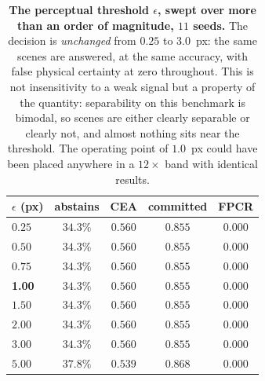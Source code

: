 \begin{table}[!ht]
\caption{\textbf{The perceptual threshold $\epsilon$, swept over more than an order
of magnitude, $11$ seeds.} The decision is \emph{unchanged} from $0.25$ to
$3.0$~px: the same scenes are answered, at the same accuracy, with false physical
certainty at zero throughout. This is not insensitivity to a weak signal but a
property of the quantity: separability on this benchmark is bimodal, so scenes are
either clearly separable or clearly not, and almost nothing sits near the
threshold. The operating point of $1.0$~px could have been placed anywhere in a
$12\times$ band with identical results.}
\label{tab:supp-epsilon}
\begin{center}
\footnotesize
\begin{tabular}{lcccc}
\toprule
$\epsilon$ (px) & \textbf{abstains} & \textbf{CEA} & \textbf{committed} & \textbf{FPCR} \\
\midrule
$0.25$ & $34.3\%$ & $0.560$ & $0.855$ & $0.000$ \\
$0.50$ & $34.3\%$ & $0.560$ & $0.855$ & $0.000$ \\
$0.75$ & $34.3\%$ & $0.560$ & $0.855$ & $0.000$ \\
\textbf{1.00} & $\mathbf{34.3\%}$ & $\mathbf{0.560}$ & $\mathbf{0.855}$ & $\mathbf{0.000}$ \\
$1.50$ & $34.3\%$ & $0.560$ & $0.855$ & $0.000$ \\
$2.00$ & $34.3\%$ & $0.560$ & $0.855$ & $0.000$ \\
$3.00$ & $34.3\%$ & $0.560$ & $0.855$ & $0.000$ \\
$5.00$ & $37.8\%$ & $0.539$ & $0.868$ & $0.000$ \\
\bottomrule
\end{tabular}
\end{center}
\end{table}

